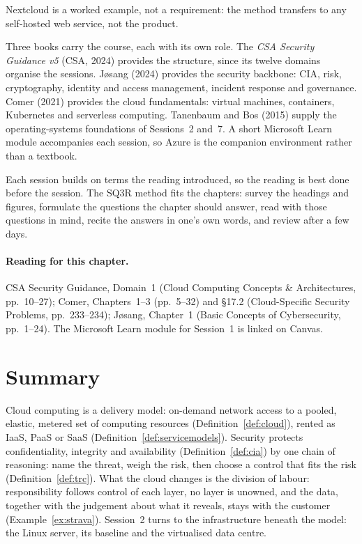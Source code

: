Nextcloud is a worked example, not a requirement: the method transfers to
any self-hosted web service, not the product.

Three books carry the course, each with its own role. The \emph{CSA Security
Guidance v5} (CSA, 2024) provides the structure, since its twelve domains
organise the sessions. J\o sang (2024) provides the security backbone: CIA,
risk, cryptography, identity and access management, incident response and
governance. Comer (2021) provides the cloud fundamentals: virtual machines,
containers, Kubernetes and serverless computing. Tanenbaum and Bos (2015)
supply the operating-systems foundations of Sessions~2 and~7. A short
Microsoft Learn module accompanies each session, so Azure is the companion
environment rather than a textbook.

Each session builds on terms the reading introduced, so the reading is best
done before the session. The SQ3R method fits the chapters:
survey the headings and figures, formulate the questions the chapter should
answer, read with those questions in mind, recite the answers in one's own
words, and review after a few days.

\paragraph{Reading for this chapter.} CSA Security Guidance, Domain~1
(Cloud Computing Concepts \& Architectures, pp.~10--27); Comer, Chapters~1--3
(pp.~5--32) and \S17.2 (Cloud-Specific Security Problems, pp.~233--234);
J\o sang, Chapter~1 (Basic Concepts of Cybersecurity, pp.~1--24). The Microsoft Learn module for Session~1
is linked on Canvas.

\section{Summary}

Cloud computing is a delivery model: on-demand network access to a pooled,
elastic, metered set of computing resources (Definition~\ref{def:cloud}),
rented as IaaS, PaaS or SaaS (Definition~\ref{def:servicemodels}). Security
protects confidentiality, integrity and availability
(Definition~\ref{def:cia}) by one chain of reasoning: name the threat, weigh
the risk, then choose a control that fits the risk
(Definition~\ref{def:trc}). What the cloud changes is the division of
labour: responsibility follows control of each layer, no layer is unowned,
and the data, together with the judgement about what it reveals, stays with
the customer (Example~\ref{ex:strava}). Session~2 turns to the infrastructure
beneath the model: the Linux server, its baseline and the virtualised data
centre.

